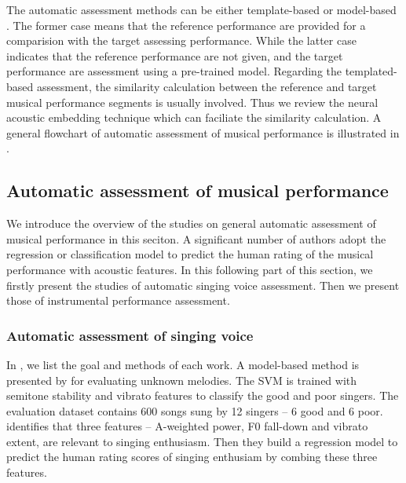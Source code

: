 The automatic assessment methods can be either template-based  or model-based . The former case means that the reference performance are provided for a comparision with the target assessing performance. While the latter case indicates that the reference performance are not given, and the target performance are assessment using a pre-trained model. Regarding the templated-based assessment, the similarity calculation between the reference and target musical performance segments is usually involved. Thus we review the neural acoustic embedding technique which can faciliate the similarity calculation. A general flowchart of automatic assessment of musical performance is illustrated in .

\subsection{Automatic assessment of musical performance}

We introduce the overview of the studies on general automatic assessment of musical performance in this seciton. A significant number of authors adopt the regression or classification model to predict the human rating of the musical performance with acoustic features. In this following part of this section, we firstly present the studies of automatic singing voice assessment. Then we present those of instrumental performance assessment.

\subsubsection{Automatic assessment of singing voice}
In , we list the goal and methods of each work. A model-based method is presented by  for evaluating unknown melodies. The SVM is trained with semitone stability and vibrato features to classify the good and poor singers. The evaluation dataset contains 600 songs sung by 12 singers -- 6 good and 6 poor.  identifies that three features -- A-weighted power, F0 fall-down and vibrato extent, are relevant to singing enthusiasm. Then they build a regression model to predict the human rating scores of singing enthusiam by combing these three features.

